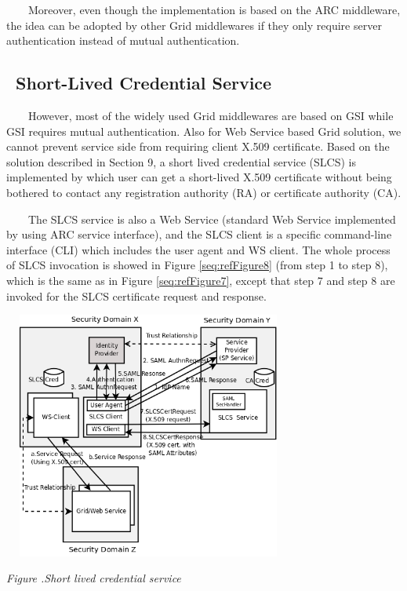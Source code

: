 \documentclass{article}
\newcounter{Figure}
\renewcommand\theFigure{\arabic{Figure}}
\begin{document}
{\upshape\color{black}
\ \ \ \ Moreover, even though the implementation is based on the ARC
middleware, the idea can be adopted by other Grid middlewares if they
only require server authentication instead of mutual authentication.}


\bigskip

\subsection[\ Short-Lived Credential
Service]{\foreignlanguage{english}{\ }Short-Lived Credential Service}
{\color{black}
\ \ \ \ However, most of the widely used Grid middlewares are based on
GSI while GSI requires mutual authentication. Also for Web Service
based Grid solution, we cannot prevent service side from requiring
client X.509 certificate. Based on the solution described in Section 9,
a short lived credential service (SLCS) is implemented by which user
can get a short-lived X.509 certificate without being bothered to
contact any registration authority (RA) or certificate authority (CA).}

{\color{black}
\ \ \ \ The SLCS service is also a Web Service (standard Web Service
implemented by using ARC service interface), and the SLCS client is a
specific command-line interface (CLI) which includes the user agent and
WS client. The whole process of SLCS invocation is showed in Figure
\ref{seq:refFigure8} (from step 1 to step 8), which is the same as in
Figure \ref{seq:refFigure7}, except that step 7 and step 8 are invoked
for the SLCS certificate request and response.}



\begin{center}
\includegraphics[width=3.7689in,height=3.2055in]{SecurityFrameworkofARC1-img8.png}
\end{center}
{\centering{}\itshape\color{black}
Figure {\theFigure\label{seq:refFigure8}}.Short
lived credential service
\par}
\end{document}
